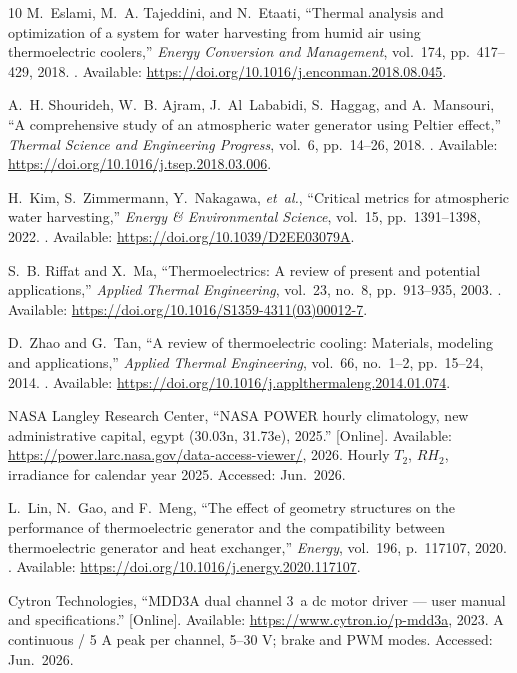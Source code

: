 \documentclass[12pt,a4paper]{report}   %
\begin{document}
\begin{thebibliography}{10}
M.~Eslami, M.~A. Tajeddini, and N.~Etaati, ``Thermal analysis and optimization
  of a system for water harvesting from humid air using thermoelectric
  coolers,'' {\em Energy Conversion and Management}, vol.~174, pp.~417--429,
  2018.
\newblock [Online]. Available:
  \url{https://doi.org/10.1016/j.enconman.2018.08.045}.

A.~H. Shourideh, W.~B. Ajram, J.~Al~Lababidi, S.~Haggag, and A.~Mansouri, ``A
  comprehensive study of an atmospheric water generator using {Peltier}
  effect,'' {\em Thermal Science and Engineering Progress}, vol.~6, pp.~14--26,
  2018.
\newblock [Online]. Available:
  \url{https://doi.org/10.1016/j.tsep.2018.03.006}.

H.~Kim, S.~Zimmermann, Y.~Nakagawa, {\em et~al.}, ``Critical metrics for
  atmospheric water harvesting,'' {\em Energy \& Environmental Science},
  vol.~15, pp.~1391--1398, 2022.
\newblock [Online]. Available: \url{https://doi.org/10.1039/D2EE03079A}.

S.~B. Riffat and X.~Ma, ``Thermoelectrics: A review of present and potential
  applications,'' {\em Applied Thermal Engineering}, vol.~23, no.~8,
  pp.~913--935, 2003.
\newblock [Online]. Available:
  \url{https://doi.org/10.1016/S1359-4311(03)00012-7}.

D.~Zhao and G.~Tan, ``A review of thermoelectric cooling: Materials, modeling
  and applications,'' {\em Applied Thermal Engineering}, vol.~66, no.~1--2,
  pp.~15--24, 2014.
\newblock [Online]. Available:
  \url{https://doi.org/10.1016/j.applthermaleng.2014.01.074}.

{NASA Langley Research Center}, ``{NASA POWER} hourly climatology, new
  administrative capital, egypt (30.03\textdegree n, 31.73\textdegree e),
  2025.'' [Online]. Available:
  \url{https://power.larc.nasa.gov/data-access-viewer/}, 2026.
\newblock Hourly $T_2$, $RH_2$, irradiance for calendar year 2025. Accessed:
  Jun.\ 2026.

L.~Lin, N.~Gao, and F.~Meng, ``The effect of geometry structures on the
  performance of thermoelectric generator and the compatibility between
  thermoelectric generator and heat exchanger,'' {\em Energy}, vol.~196,
  p.~117107, 2020.
\newblock [Online]. Available:
  \url{https://doi.org/10.1016/j.energy.2020.117107}.

{Cytron Technologies}, ``{MDD3A} dual channel 3~a dc motor driver --- user
  manual and specifications.'' [Online]. Available:
  \url{https://www.cytron.io/p-mdd3a}, 2023.
 A continuous / 5 A peak per channel, 5--30 V; brake and PWM modes.
  Accessed: Jun.\ 2026.


\end{thebibliography}
\end{document}
